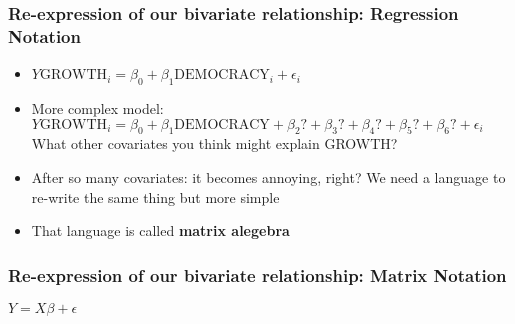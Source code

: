 \documentclass[compress]{beamer}
\begin{document}
\begin{frame}\frametitle{Re-expression of our bivariate relationship: Regression Notation}
\begin{itemize}
\item $Y\text{GROWTH}_{i} = \beta_{0} + \beta_{1}\text{DEMOCRACY}_{i} + \epsilon_{i}$\pause
\item {\color{red}More complex model}: \\
$Y\text{GROWTH}_{i} = \beta_{0} + \beta_{1}\text{DEMOCRACY} + \beta_{2}\text{?} + \beta_{3}\text{?} + \beta_{4}\text{?} 
+ \beta_{5}\text{?} + \beta_{6}\text{?}  + \epsilon_{i}$\\
{\color{red}What other covariates you think might explain GROWTH?}\\\pause
\item {\color{red}After so many covariates}: it becomes annoying, right? We need a language to re-write the same thing but more simple
\item That language is called {\bf matrix alegebra}
\end{itemize}
\end{frame}

\begin{frame}\frametitle{Re-expression of our bivariate relationship: Matrix Notation}
\centering $Y=X\beta + \epsilon$
\end{frame}
\end{document}
